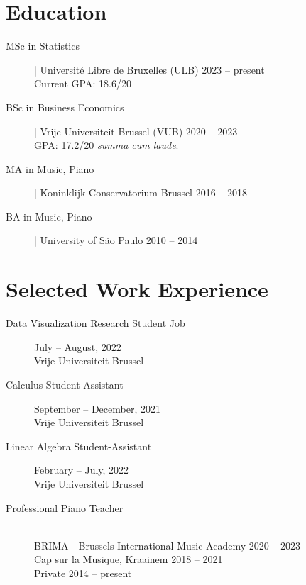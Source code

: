 \documentclass[11pt, a4paper, sans]{article}
\newcommand{\mycolor}{mySlateBlue}           %
\newcommand{\thesectionicon}{}
\newcommand{\sectionicon}[1]{\renewcommand{\thesectionicon}{#1}}
\newcommand{\adjust}{\vspace{-1.01ex}}
\begin{document}
\section{Education}
\begin{description}
\item[\textcolor{\mycolor}{MSc in Statistics}] | Université Libre de Bruxelles (ULB)
  \hfill 2023 -- present \\
  Current GPA: 18.6/20
  \adjust

\item[\textcolor{\mycolor}{BSc in Business Economics}] | Vrije Universiteit Brussel (VUB)
  \hfill  2020 -- 2023\\
  GPA: 17.2/20 \emph{summa cum laude}.
  \adjust

\item[\textcolor{\mycolor}{MA in Music, Piano}] | Koninklijk Conservatorium Brussel
  \hfill 2016 -- 2018\adjust

\item[\textcolor{\mycolor}{BA in Music, Piano}] | University of São Paulo
  \hfill 2010 -- 2014
\end{description} 
\sectionicon{\faToolbox}
\section{Selected Work Experience}
\begin{description}

\item[\textcolor{\mycolor}{Data Visualization Research Student Job}]
  \hfill July -- August, 2022\\
  Vrije Universiteit Brussel
  \adjust
  
\item[\textcolor{\mycolor}{Calculus Student-Assistant}]
  \hfill September -- December, 2021\\
  Vrije Universiteit Brussel
  \adjust

\item[\textcolor{\mycolor}{Linear Algebra Student-Assistant}]
  \hfill February -- July, 2022\\
  Vrije Universiteit Brussel
  \adjust

\item[\textcolor{\mycolor}{Professional Piano Teacher}] \hfill \\
  BRIMA - Brussels International Music Academy \hfill 2020 -- 2023\\
  Cap sur la Musique, Kraainem \hfill 2018 -- 2021\\
  Private \hfill 2014 -- present  
  \adjust

\end{description}
\sectionicon{\faTools}
\end{document}
